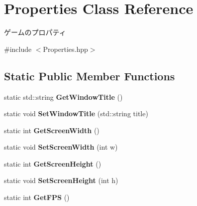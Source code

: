 \hypertarget{class_properties}{}\section{Properties Class Reference}
\label{class_properties}


ゲームのプロパティ  




{\ttfamily \#include $<$Properties.\+hpp$>$}

\subsection*{Static Public Member Functions}
\begin{DoxyCompactItemize}
\item 
static std\+::string {\bfseries Get\+Window\+Title} ()\hypertarget{class_properties_a2bf4f6d1b34175d27b0fb81713788c25}{}\label{class_properties_a2bf4f6d1b34175d27b0fb81713788c25}

\item 
static void {\bfseries Set\+Window\+Title} (std\+::string title)\hypertarget{class_properties_a599ad4c5574d6a93bfa3d0312e8695de}{}\label{class_properties_a599ad4c5574d6a93bfa3d0312e8695de}

\item 
static int {\bfseries Get\+Screen\+Width} ()\hypertarget{class_properties_a44e8000418ebc66a893b286d759d51f7}{}\label{class_properties_a44e8000418ebc66a893b286d759d51f7}

\item 
static void {\bfseries Set\+Screen\+Width} (int w)\hypertarget{class_properties_aeeb8976df771047ab2e0fbdcaf6e49f1}{}\label{class_properties_aeeb8976df771047ab2e0fbdcaf6e49f1}

\item 
static int {\bfseries Get\+Screen\+Height} ()\hypertarget{class_properties_a2862ea01d6c6ae2dd013fe0368eeed1b}{}\label{class_properties_a2862ea01d6c6ae2dd013fe0368eeed1b}

\item 
static void {\bfseries Set\+Screen\+Height} (int h)\hypertarget{class_properties_a92dafc4b3a02a9a4e04709b9af290b60}{}\label{class_properties_a92dafc4b3a02a9a4e04709b9af290b60}

\item 
static int {\bfseries Get\+F\+PS} ()\hypertarget{class_properties_a9d100501fafa0d296c210b295ea5e09e}{}\label{class_properties_a9d100501fafa0d296c210b295ea5e09e}


\end{DoxyCompactItemize}
